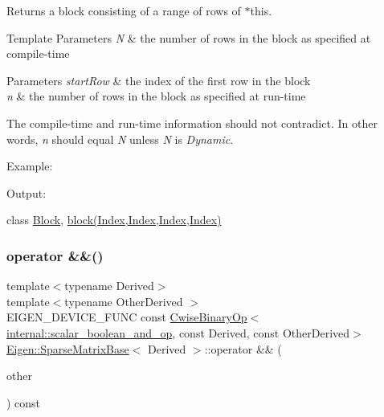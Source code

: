 \begin{DoxyReturn}{Returns}
a block consisting of a range of rows of $\ast$this.
\end{DoxyReturn}

\begin{DoxyTemplParams}{Template Parameters}
{\em N} & the number of rows in the block as specified at compile-\/time \\
\hline
\end{DoxyTemplParams}

\begin{DoxyParams}{Parameters}
{\em start\+Row} & the index of the first row in the block \\
\hline
{\em n} & the number of rows in the block as specified at run-\/time\\
\hline
\end{DoxyParams}
The compile-\/time and run-\/time information should not contradict. In other words, {\itshape n} should equal {\itshape N} unless {\itshape N} is {\itshape Dynamic}.

Example\+: 
\begin{DoxyCodeInclude}{0}
\end{DoxyCodeInclude}
 Output\+: 
\begin{DoxyVerbInclude}
\end{DoxyVerbInclude}
 class \mbox{\hyperlink{class_eigen_1_1_block}{Block}}, \mbox{\hyperlink{class_eigen_1_1_sparse_matrix_base_a7c28a2f511181c727396d5e813519d38}{block(\+Index,\+Index,\+Index,\+Index)}} \mbox{\label{class_eigen_1_1_sparse_matrix_base_a80b919642bae921a0603fefefb51eb52}} 
\subsubsection{\texorpdfstring{operator \&\&()}{operator \&\&()}}
{\footnotesize\ttfamily template$<$typename Derived$>$ \\
template$<$typename Other\+Derived $>$ \\
E\+I\+G\+E\+N\+\_\+\+D\+E\+V\+I\+C\+E\+\_\+\+F\+U\+NC const \mbox{\hyperlink{class_eigen_1_1_cwise_binary_op}{Cwise\+Binary\+Op}}$<$\mbox{\hyperlink{struct_eigen_1_1internal_1_1scalar__boolean__and__op}{internal\+::scalar\+\_\+boolean\+\_\+and\+\_\+op}}, const Derived, const Other\+Derived$>$ \mbox{\hyperlink{class_eigen_1_1_sparse_matrix_base}{Eigen\+::\+Sparse\+Matrix\+Base}}$<$ Derived $>$\+::operator \&\& (\begin{DoxyParamCaption}\item[{const E\+I\+G\+E\+N\+\_\+\+C\+U\+R\+R\+E\+N\+T\+\_\+\+S\+T\+O\+R\+A\+G\+E\+\_\+\+B\+A\+S\+E\+\_\+\+C\+L\+A\+SS$<$ Other\+Derived $>$ \&}]{other }\end{DoxyParamCaption}) const\hspace{0.3cm}{\ttfamily [inline]}}

